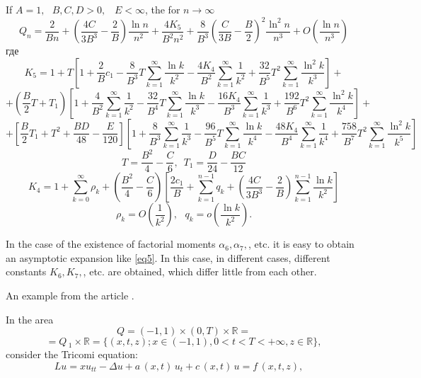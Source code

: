 \documentclass{mfitjournal-en}%
\begin{document}
\begin{engtheorem}[2]
	If $A=1,\, \, \, \, B,C,D>0,\, \, \, \, \, E<\infty $, the for $n\to \infty $ 
	\begin{equation}\label{eq5}
	Q_{n} =\frac{2}{Bn} +\left(\frac{4C}{3B^{3} } -\frac{2}{B} \right)\frac{\ln n}{n^{2} } +\frac{4K_{5} }{B^{2} n^{2} } +\frac{8}{B^{3} } \left(\frac{C}{3B} -\frac{B}{2} \right)^{2} \frac{\ln ^{2} n}{n^{3} } +O\left(\frac{\ln n}{n^{3} } \right)
	\end{equation}
	где  
	$${K_{5} =1+T\left[1+\frac{2}{B} c_{1} -\frac{8}{B^{3} } T\sum\limits_ {k=1}^{\infty }\frac{\ln k}{k^{2} }  -\frac{4K_{4} }{B^{2} } \sum\limits _{k=1}^{\infty }\frac{1}{k^{2} }  +\frac{32}{B^{5} } T^{2} \sum\limits _{k=1}^{\infty }\frac{\ln ^{2} k}{k^{3} }  \right]+}$$
	$${+\left(\frac{B}{2} T+T_{1} \right)\left[1+\frac{4}{B^{2} } \sum\limits _{k=1}^{\infty }\frac{1}{k^{2} }  -\frac{32}{B^{4} } T\sum\limits _{k=1}^{\infty }\frac{\ln k}{k^{3} }  -\frac{16K_{4} }{B^{3} } \sum\limits _{k=1}^{\infty }\frac{1}{k^{3} }  +\frac{192}{B^{6} } T^{2} \sum\limits _{k=1}^{\infty }\frac{\ln ^{2} k}{k^{4} }  \right]+}$$
	$${+\left[\frac{B}{2} T_{1} +T^{2} +\frac{BD}{48} -\frac{E}{120} \right]\left[1+\frac{8}{B^{3} } \sum\limits _{k=1}^{\infty }\frac{1}{k^{3} }  -\frac{96}{B^{5} } T\sum\limits _{k=1}^{\infty }\frac{\ln k}{k^{4} }  -\frac{48K_{4} }{B^{4} } \sum\limits _{k=1}^{\infty }\frac{1}{k^{4} }  +\frac{758}{B^{7} } T^{2} \sum\limits _{k=1}^{\infty }\frac{\ln ^{2} k}{k^{5} }  \right]}$$
	$$T=\frac{B^{2} }{4} -\frac{C}{6} ,\, \, \, T_{1} =\frac{D}{24} -\frac{BC}{12}$$ 
	$${K_{4} =1+\sum\limits _{k=0}^{\infty }\rho _{k}  +\left(\frac{B^{2} }{4} -\frac{C}{6} \right)\left[\frac{2c_{1} }{B} +\sum\limits _{k=1}^{n-1}q_{k}  +\left(\frac{4C}{3B^{3} } -\frac{2}{B} \right)\sum\limits _{k=1}^{n-1}\frac{\ln k}{k^{2} }  \right]}$$
	$${\rho _{k} =O\left(\frac{1}{k^{2} } \right),\, \, \, \, q_{k} =o\left(\frac{\ln k}{k^{2} } \right).}$$
\end{engtheorem}

\begin{engremark}[1]
In the case of the existence of factorial moments $ \alpha _ {6}, \alpha _ {7}, $, etc. it is easy to obtain an asymptotic expansion like \eqref{eq5}. In this case, in different cases, different constants $ K_ {6}, K_ {7}, $, etc. are obtained, which differ little from each other.
\end{engremark} 

An example from the article \cite{DjaAshTur21}.

In the area $$ Q = (- 1,1) \times (0, T) \times {\mathbb R} = $$ $$ = Q \, _ {1} \times {\mathbb R} = \{( x, t, z); x \in (-1,1), 0 <t <T <+ \infty, z \in {\mathbb R}\}, $$ consider the Tricomi equation:
\begin{equation}\label{eq6}
Lu=xu_{tt} -\Delta u+a\, (x,t)\, u_{t} +c\, (x,t)\, u=f\, (x,t,z),\quad
\end{equation}
\end{document}
